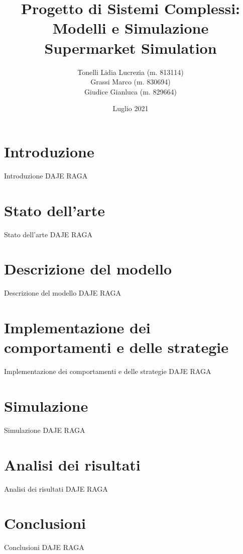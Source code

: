\documentclass[11pt]{beamer}
\author{Tonelli Lidia Lucrezia (m. 813114) \\ Grassi Marco (m. 830694) \\ Giudice Gianluca (m. 829664)}
\title{Progetto di Sistemi Complessi: Modelli e Simulazione\\Supermarket Simulation}
\institute[University of Milano Bicocca] 
{
University of Milano Bicocca \\ 
\medskip
}
\date{Luglio 2021}
\begin{document}
\begin{frame}
\titlepage
\end{frame}

\begin{frame}
\tableofcontents
\end{frame}

\section{Introduzione}
\begin{frame}{Introduzione}
\centering
DAJE RAGA
\end{frame}

\section{Stato dell'arte}
\begin{frame}{Stato dell'arte}
\centering
DAJE RAGA
\end{frame}

\section{Descrizione del modello}
\begin{frame}{Descrizione del modello}
\centering
DAJE RAGA
\end{frame}

\section{Implementazione dei comportamenti e delle strategie}
\begin{frame}{Implementazione dei comportamenti e delle strategie}
\centering
DAJE RAGA
\end{frame}

\section{Simulazione}
\begin{frame}{Simulazione}
\centering
DAJE RAGA
\end{frame}

\section{Analisi dei risultati}
\begin{frame}{Analisi dei risultati}
\centering
DAJE RAGA
\end{frame}

\section{Conclusioni}
\begin{frame}{Conclusioni}
\centering
DAJE RAGA
\end{frame}
\end{document}
